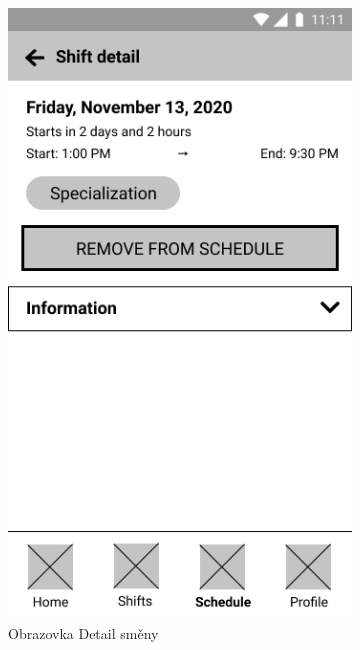 \documentclass[twoside]{ctuthesis}
\begin{document}
\begin{figure}[h!]
	\centering
	\begin{subfigure}{.45\textwidth}
		\centering
		\includegraphics[scale=.35]{img/shift-detail-remove.png}
		\caption{Obrazovka Detail směny}
		\label{fig:shift-detail-remove}
	\end{subfigure}
	\begin{subfigure}{.45\textwidth}
		\centering

\end{subfigure}
\end{figure}
\end{document}
